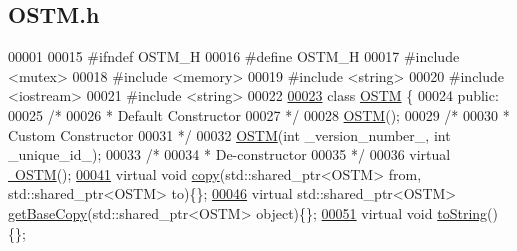 \hypertarget{_o_s_t_m_8h_source}{}\subsection{O\+S\+T\+M.\+h}

\begin{DoxyCode}
00001 
00015 \textcolor{preprocessor}{#ifndef OSTM\_H}
00016 \textcolor{preprocessor}{#define OSTM\_H}
00017 \textcolor{preprocessor}{#include <mutex>}
00018 \textcolor{preprocessor}{#include <memory>}
00019 \textcolor{preprocessor}{#include <string>}
00020 \textcolor{preprocessor}{#include <iostream>}
00021 \textcolor{preprocessor}{#include <string>}
00022 
\hypertarget{_o_s_t_m_8h_source.tex_l00023}{}\hyperlink{class_o_s_t_m}{00023} \textcolor{keyword}{class }\hyperlink{class_o_s_t_m}{OSTM} \{
00024 \textcolor{keyword}{public}:
00025     \textcolor{comment}{/*}
00026 \textcolor{comment}{     * Default Constructor}
00027 \textcolor{comment}{     */}
00028     \hyperlink{class_o_s_t_m_a968edf778668bd0ec7603f0571619196_a968edf778668bd0ec7603f0571619196}{OSTM}();
00029     \textcolor{comment}{/*}
00030 \textcolor{comment}{     * Custom Constructor}
00031 \textcolor{comment}{     */}
00032     \hyperlink{class_o_s_t_m_a968edf778668bd0ec7603f0571619196_a968edf778668bd0ec7603f0571619196}{OSTM}(\textcolor{keywordtype}{int} \_version\_number\_, \textcolor{keywordtype}{int} \_unique\_id\_);
00033     \textcolor{comment}{/*}
00034 \textcolor{comment}{     * De-constructor}
00035 \textcolor{comment}{     */}
00036     \textcolor{keyword}{virtual} \hyperlink{class_o_s_t_m_a30a17d73d0259c60eeab72d6dfa9ceb1_a30a17d73d0259c60eeab72d6dfa9ceb1}{~OSTM}();
\hypertarget{_o_s_t_m_8h_source.tex_l00041}{}\hyperlink{class_o_s_t_m_a535d90fced5adbb70312c92f3778e08d_a535d90fced5adbb70312c92f3778e08d}{00041}     \textcolor{keyword}{virtual} \textcolor{keywordtype}{void} \hyperlink{class_o_s_t_m_a535d90fced5adbb70312c92f3778e08d_a535d90fced5adbb70312c92f3778e08d}{copy}(std::shared\_ptr<OSTM> from, std::shared\_ptr<OSTM> to)\{\};  
\hypertarget{_o_s_t_m_8h_source.tex_l00046}{}\hyperlink{class_o_s_t_m_a0bfa3763bd441407dd6365f42714f94c_a0bfa3763bd441407dd6365f42714f94c}{00046}     \textcolor{keyword}{virtual} std::shared\_ptr<OSTM> \hyperlink{class_o_s_t_m_a0bfa3763bd441407dd6365f42714f94c_a0bfa3763bd441407dd6365f42714f94c}{getBaseCopy}(std::shared\_ptr<OSTM> \textcolor{keywordtype}{object})\{\};
\hypertarget{_o_s_t_m_8h_source.tex_l00051}{}\hyperlink{class_o_s_t_m_a513396a115f2987fd07c203309ae8a59_a513396a115f2987fd07c203309ae8a59}{00051}     \textcolor{keyword}{virtual} \textcolor{keywordtype}{void} \hyperlink{class_o_s_t_m_a513396a115f2987fd07c203309ae8a59_a513396a115f2987fd07c203309ae8a59}{toString}()\{\};

\end{DoxyCode}
